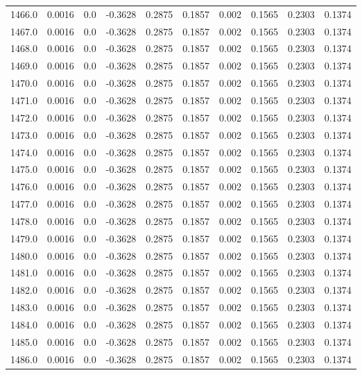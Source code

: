 \begin{longtable}{lrrrrrrrrr}
1466.0 & 0.0016 & 0.0 & -0.3628 & 0.2875 & 0.1857 & 0.002 & 0.1565 & 0.2303 & 0.1374 \\
1467.0 & 0.0016 & 0.0 & -0.3628 & 0.2875 & 0.1857 & 0.002 & 0.1565 & 0.2303 & 0.1374 \\
1468.0 & 0.0016 & 0.0 & -0.3628 & 0.2875 & 0.1857 & 0.002 & 0.1565 & 0.2303 & 0.1374 \\
1469.0 & 0.0016 & 0.0 & -0.3628 & 0.2875 & 0.1857 & 0.002 & 0.1565 & 0.2303 & 0.1374 \\
1470.0 & 0.0016 & 0.0 & -0.3628 & 0.2875 & 0.1857 & 0.002 & 0.1565 & 0.2303 & 0.1374 \\
1471.0 & 0.0016 & 0.0 & -0.3628 & 0.2875 & 0.1857 & 0.002 & 0.1565 & 0.2303 & 0.1374 \\
1472.0 & 0.0016 & 0.0 & -0.3628 & 0.2875 & 0.1857 & 0.002 & 0.1565 & 0.2303 & 0.1374 \\
1473.0 & 0.0016 & 0.0 & -0.3628 & 0.2875 & 0.1857 & 0.002 & 0.1565 & 0.2303 & 0.1374 \\
1474.0 & 0.0016 & 0.0 & -0.3628 & 0.2875 & 0.1857 & 0.002 & 0.1565 & 0.2303 & 0.1374 \\
1475.0 & 0.0016 & 0.0 & -0.3628 & 0.2875 & 0.1857 & 0.002 & 0.1565 & 0.2303 & 0.1374 \\
1476.0 & 0.0016 & 0.0 & -0.3628 & 0.2875 & 0.1857 & 0.002 & 0.1565 & 0.2303 & 0.1374 \\
1477.0 & 0.0016 & 0.0 & -0.3628 & 0.2875 & 0.1857 & 0.002 & 0.1565 & 0.2303 & 0.1374 \\
1478.0 & 0.0016 & 0.0 & -0.3628 & 0.2875 & 0.1857 & 0.002 & 0.1565 & 0.2303 & 0.1374 \\
1479.0 & 0.0016 & 0.0 & -0.3628 & 0.2875 & 0.1857 & 0.002 & 0.1565 & 0.2303 & 0.1374 \\
1480.0 & 0.0016 & 0.0 & -0.3628 & 0.2875 & 0.1857 & 0.002 & 0.1565 & 0.2303 & 0.1374 \\
1481.0 & 0.0016 & 0.0 & -0.3628 & 0.2875 & 0.1857 & 0.002 & 0.1565 & 0.2303 & 0.1374 \\
1482.0 & 0.0016 & 0.0 & -0.3628 & 0.2875 & 0.1857 & 0.002 & 0.1565 & 0.2303 & 0.1374 \\
1483.0 & 0.0016 & 0.0 & -0.3628 & 0.2875 & 0.1857 & 0.002 & 0.1565 & 0.2303 & 0.1374 \\
1484.0 & 0.0016 & 0.0 & -0.3628 & 0.2875 & 0.1857 & 0.002 & 0.1565 & 0.2303 & 0.1374 \\
1485.0 & 0.0016 & 0.0 & -0.3628 & 0.2875 & 0.1857 & 0.002 & 0.1565 & 0.2303 & 0.1374 \\
1486.0 & 0.0016 & 0.0 & -0.3628 & 0.2875 & 0.1857 & 0.002 & 0.1565 & 0.2303 & 0.1374 \\

\end{longtable}
